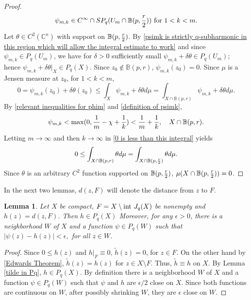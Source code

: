 \documentclass[12pt]{amsart}
\newtheorem{lem}[theorem]{Lemma}
\numberwithin{equation}{section}
{\theoremstyle{definition}
\newtheorem{remark}[theorem]{Remark}
}
\begin{document}
\begin{proof}
\begin{equation}
    \psi_{m, k} \in C^{\infty} \cap SP_q(U_m \cap \mathbb{B}(p, {r \over 2})) \hbox{ for } 1 < k < m.
\end{equation}
Let $\theta \in C^2(\mathbb{C}^n)$ with support on $\mathbb{B}(p, {r \over 2})$.  By \eqref{psimk is strictly q-subharmonic in this region which will allow the integral estimate to work} and since $\psi_{m, k} \in P_q(U_m)$, we have for $\delta > 0$ sufficiently small $\psi_{m, k} + \delta\theta \in P_q(U_m)$; hence $\psi_{m, k} + \delta\theta|_X \in P_q(X)$.  Since $z_0 \not\in \mathbb{B}(p, r)$, $\psi_{m, k}(z_0) = 0$.  Since $\mu$ is a Jensen measure at $z_0$, for $1 < k < m$,
\begin{equation}\label{0 is less than this integral}
0 = \psi_{m, k}(z_0) + \delta\theta(z_0) \leq \int_{X} \psi_{m, k} + \delta\theta d\mu
= \int_{X \cap \mathbb{B}(p, r)} \psi_{m, k} + \delta\theta d\mu. 
\end{equation}
By \eqref{relevant inequalities for phim} and \eqref{definition of psimk},
\begin{equation*}
    \psi_{m, k} < \max(0, {1 \over m} -\chi + {1 \over k}) < {1 \over m} + {1 \over k}, \quad X \cap \mathbb{B}(p, r).
\end{equation*}
Letting $m \to \infty$ and then $k \to \infty$ in \eqref{0 is less than this integral} yields
$$
0 \leq \int_{X \cap \mathbb{B}(p, r)}\theta d\mu = \int_{X \cap \mathbb{B}(p, {r \over 2})}\theta d\mu.
$$
Since $\theta$ is an arbitrary $C^2$ function supported on $\mathbb{B}(p, {r \over 2})$, $\mu(X \cap \mathbb{B}(p, {r \over 2})) = 0$.
\end{proof}


In the next two lemmas, $d(z, F)$ will denote the distance from $z$ to $F$.

\begin{lem}\label{distance function is Pq}
Let $X$ be compact, $F = X \setminus \hbox{int }J_q(X)$ be nonempty and $h(z) = d(z, F)$.  Then $h \in P_q(X)$  Moreover, for any $\epsilon > 0$, there is a neighborhood $W$ of $X$ and a function $\psi \in P_q(W)$ such that 
$
|\psi(z) - h(z)| < \epsilon,
$
for all $z \in W$.

\end{lem}
\begin{proof}
   Since $0 \leq h(z)$ and $h|_F \equiv 0$, $\tilde{h}(z) = 0$, for $z \in F$.  On the other hand by \eqref{Edwards Theorem},
    $
        \tilde{h}(z) = h(z)$ for $z \in X \setminus F$.  Thus, $\tilde{h} \equiv h$ on $X$.  By Lemma \ref{tilde in Pq}, $h \in P_q(X)$. By definition there is a neighborhood $W$ of $X$ and a function $\psi \in P_q(W)$ such that $\psi$ and $h$ are $\epsilon/2$ close on $X$.  Since both functions are continuous on $W$, after possibly shrinking $W$, they are $\epsilon$ close on $W$.
\end{proof}
\end{document}
